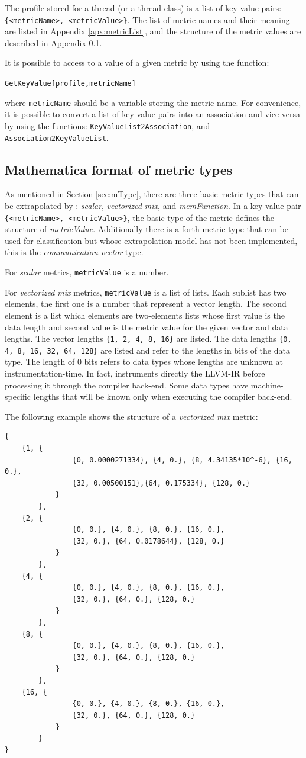 \documentclass[a4paper, 10pt]{article}
\begin{document}
The profile stored for a thread (or a thread class) is a list of key-value pairs: \verb!{<metricName>, <metricValue>}!.
The list of metric names and their meaning are listed in Appendix \ref{apx:metricList}, and the structure of the metric values
are described in Appendix \ref{apx:matheMetricFormat}.

It is possible to access to a value of a given metric by using the function: 

\verb!GetKeyValue[profile,metricName]!

where \verb!metricName! should be a variable storing the metric name.
For convenience, it is possible to convert a list of key-value pairs into an association and vice-versa by using the functions:
\verb!KeyValueList2Association!, and \verb!Association2KeyValueList!.


\subsection{Mathematica format of metric types}
\label{apx:matheMetricFormat}
As mentioned in Section \ref{sec:mType}, there are three basic metric types that can be extrapolated by \ex:
\textit{scalar}, \textit{vectorized mix}, and \textit{memFunction}.
In a key-value pair \verb!{<metricName>, <metricValue>}!, the basic type of the metric defines the structure of \textit{metricValue}.
Additionally there is a forth metric type that can be used for classification but whose extrapolation model has not been implemented,
this is the \textit{communication vector} type.

For \textit{scalar} metrics, \verb!metricValue! is a number.

For \textit{vectorized mix} metrics, \verb!metricValue! is a list of lists.
Each sublist has two elements, the first one is a number that represent a vector length.
The second element is a list which elements are two-elements lists whose first value is the data length and second value is the metric value
for the given vector and data lengths.
The vector lengths \verb!{1, 2, 4, 8, 16}! are listed. The data lengths \verb!{0, 4, 8, 16, 32, 64, 128}! are listed and refer to the lengths
in bits of the data type.
The length of 0 bits refers to data types whose lengths are unknown at instrumentation-time.
In fact, \pisa instruments directly the LLVM-IR before processing it through the compiler back-end. Some data types have machine-specific lengths
that will be known only when executing the compiler back-end.

The following example shows the structure of a \textit{vectorized mix} metric:
\begin{Verbatim}[obeytabs, tabsize=4, frame=lines]
{
	{1, {
				{0, 0.0000271334}, {4, 0.}, {8, 4.34135*10^-6}, {16, 0.},
				{32, 0.00500151},{64, 0.175334}, {128, 0.}
			}
		},
	{2, {
				{0, 0.}, {4, 0.}, {8, 0.}, {16, 0.},
				{32, 0.}, {64, 0.0178644}, {128, 0.}
			}
		},
	{4, {
				{0, 0.}, {4, 0.}, {8, 0.}, {16, 0.},
				{32, 0.}, {64, 0.}, {128, 0.}
			}
		},
	{8, {
				{0, 0.}, {4, 0.}, {8, 0.}, {16, 0.},
				{32, 0.}, {64, 0.}, {128, 0.}
			}
		},
	{16, {
				{0, 0.}, {4, 0.}, {8, 0.}, {16, 0.},
				{32, 0.}, {64, 0.}, {128, 0.}
			}
		}
}
\end{Verbatim}
\end{document}
